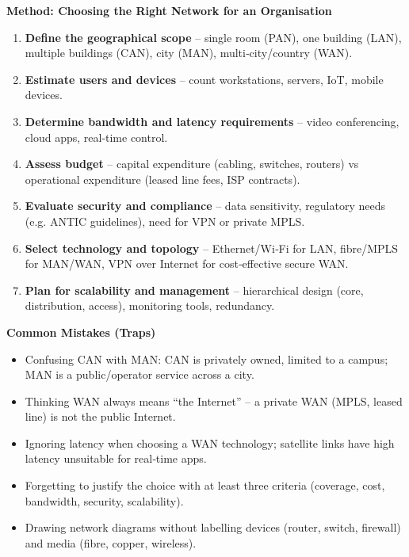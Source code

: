 \documentclass[11pt]{article}
\newcommand{\cle}[1]{{\popxbold\color{popdark}#1}}
\begin{document}
\begin{bilan}
\textbf{Method: Choosing the Right Network for an Organisation}
\begin{enumerate}
\item \textbf{Define the geographical scope} – single room (PAN), one building (LAN), multiple buildings (CAN), city (MAN), multi‑city/country (WAN).
\item \textbf{Estimate users and devices} – count workstations, servers, IoT, mobile devices.
\item \textbf{Determine bandwidth and latency requirements} – video conferencing, cloud apps, real‑time control.
\item \textbf{Assess budget} – capital expenditure (cabling, switches, routers) vs operational expenditure (leased line fees, ISP contracts).
\item \textbf{Evaluate security and compliance} – data sensitivity, regulatory needs (e.g. ANTIC guidelines), need for VPN or private MPLS.
\item \textbf{Select technology and topology} – Ethernet/Wi‑Fi for LAN, fibre/MPLS for MAN/WAN, VPN over Internet for cost‑effective secure WAN.
\item \textbf{Plan for scalability and management} – hierarchical design (core, distribution, access), monitoring tools, redundancy.
\end{enumerate}

\textbf{Common Mistakes (Traps)}
\begin{itemize}
\item Confusing \cle{CAN} with \cle{MAN}: CAN is privately owned, limited to a campus; MAN is a public/operator service across a city.
\item Thinking \cle{WAN} always means “the Internet” – a private WAN (MPLS, leased line) is not the public Internet.
\item Ignoring \cle{latency} when choosing a WAN technology; satellite links have high latency unsuitable for real‑time apps.
\item Forgetting to justify the choice with at least three criteria (coverage, cost, bandwidth, security, scalability).
\item Drawing network diagrams without labelling devices (router, switch, firewall) and media (fibre, copper, wireless).
\end{itemize}


\end{bilan}
\end{document}
